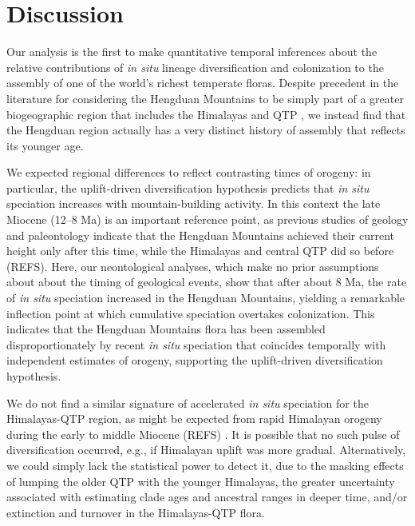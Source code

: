 \section{Discussion}

Our analysis is the first to make quantitative temporal inferences about the relative contributions of \textit{in situ} lineage diversification and colonization to the assembly of one of the world's richest temperate floras. Despite precedent in the literature for considering the Hengduan Mountains to be simply part of a greater biogeographic region that includes the Himalayas and QTP \citep[e.g.][]{Zhang2014,Nie2013,GaoY2013,Matuszak2016}, we instead find that the Hengduan region actually has a very distinct history of assembly that reflects its younger age.

We expected regional differences to reflect contrasting times of orogeny: in particular, the uplift-driven diversification hypothesis predicts that \textit{in situ} speciation increases with mountain-building activity. In this context the late Miocene (12--8 Ma) is an important reference point, as previous studies of geology and paleontology indicate that the Hengduan Mountains achieved their current height only after this time, while the Himalayas and central QTP did so before (REFS). Here, our neontological analyses, which make no prior assumptions about about the timing of geological events, show that after about 8 Ma, the rate of \textit{in situ} speciation increased in the Hengduan Mountains, yielding a remarkable inflection point at which cumulative speciation overtakes colonization. This indicates that the Hengduan Mountains flora has been assembled disproportionately by recent \textit{in situ} speciation that coincides temporally with independent estimates of orogeny, supporting the uplift-driven diversification hypothesis.

We do not find a similar signature of accelerated \textit{in situ} speciation for the Himalayas-QTP region, as might be expected from rapid Himalayan orogeny during the early to middle Miocene (REFS)  %
. It is possible that no such pulse of diversification occurred, e.g., if Himalayan uplift was more gradual. Alternatively, we could simply lack the statistical power to detect it, due to the masking effects of lumping the older QTP with the younger Himalayas, the greater uncertainty associated with estimating clade ages and ancestral ranges in deeper time, and/or extinction and turnover in the Himalayas-QTP flora.

